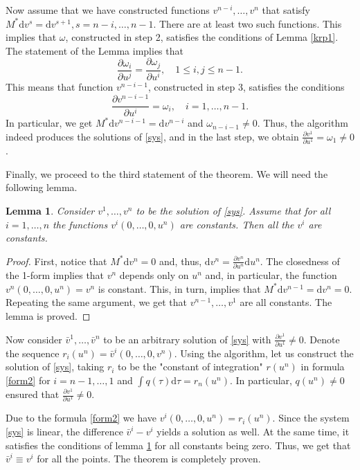 \documentclass[12pt]{article}
\newtheorem{Lemma}{Lemma}[section]
\theoremstyle{remark}
\newcommand{\ddd}{\mathrm{d}}
\newcommand{\pd}[2]{\frac{\partial#1}{\partial#2}}
\begin{document}
Now assume that we have constructed functions $v^{n - i}, \dots, v^n$ that satisfy $M^* \ddd v^s = \ddd v^{s + 1}, s = n - i, \dots, n - 1$. There are at least two such functions. This implies that $\omega$, constructed in step 2, satisfies the conditions of Lemma \ref{krp1}. The statement of the Lemma implies that
$$
\pd{\omega_i}{u^j} = \pd{\omega_j}{u^i}, \quad 1 \leq i, j \leq n - 1.
$$
This means that function $v^{n - i - 1}$, constructed in step 3, satisfies the conditions
$$
\pd{v^{n - i - 1}}{u^i} = \omega_i, \quad i = 1, \dots, n - 1.
$$
In particular, we get $M^* \ddd v^{n - i - 1} = \ddd v^{n - i}$ and $\omega_{n - i - 1} \neq 0$. Thus, the algorithm indeed produces the solutions of \eqref{sys}, and in the last step, we obtain $\pd{v^1}{u^1} = \omega_1 \neq 0$.

Finally, we proceed to the third statement of the theorem. We will need the following lemma.

\begin{Lemma}\label{krp2}
Consider $v^1, \dots, v^n$ to be the solution of \eqref{sys}. Assume that for all $i = 1, \dots, n$ the functions $v^i(0, \dots, 0, u^n)$ are constants. Then all the $v^i$ are constants.    
\end{Lemma}
\begin{proof}
First, notice that $M^* \ddd v^n = 0$ and, thus, $\ddd v^n = \pd{v^n}{u^n} \ddd u^n$. The closedness of the 1-form implies that $v^n$ depends only on $u^n$ and, in particular, the function $v^n(0, \dots, 0, u^n) = v^n$ is constant. This, in turn, implies that $M^* \ddd v^{n - 1} = \ddd v^n = 0$. Repeating the same argument, we get that $v^{n - 1}, \dots, v^1$ are all constants. The lemma is proved.  
\end{proof}

Now consider $\bar v^1, \dots, \bar v^n$ to be an arbitrary solution of \eqref{sys} with $\pd{v^1}{u^1} \neq 0$. Denote the sequence $r_i(u^n) = \bar v^i(0, \dots, 0, v^n)$. Using the algorithm, let us construct the solution of \eqref{sys}, taking $r_i$ to be the "constant of integration" $r(u^n)$ in formula \eqref{form2} for $i = n - 1, \dots, 1$ and $\int q(\tau) \ddd \tau = r_n(u^n)$. In particular, $q(u^n) \neq 0$ ensured that $\pd{v^1}{u^1} \neq 0$.

Due to the formula \eqref{form2} we have $v^i(0, \dots, 0, u^n) = r_i(u^n)$. Since the system \eqref{sys} is linear, the difference $\bar v^i - v^i$ yields a solution as well. At the same time, it satisfies the conditions of lemma \ref{krp2} for all constants being zero. Thus, we get that $\bar v^i \equiv v^i$ for all the points. The theorem is completely proven.
\end{document}
